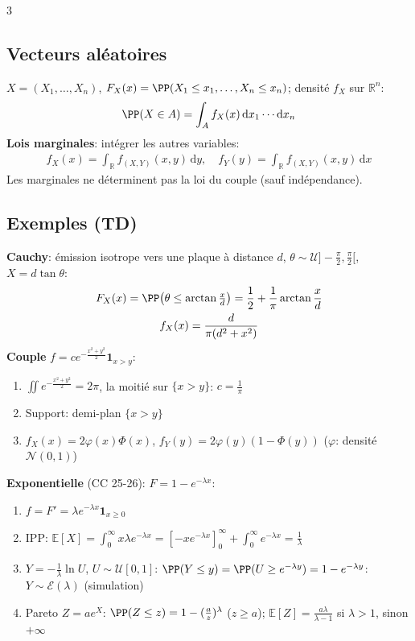 \documentclass[12pt, a4paper]{article}
\newcommand{\dd}{\mathrm{d}}
\newcommand{\E}{\mathbb{E}}
\newcommand{\R}{\mathbb{R}}
\newcommand{\ind}{\mathbf{1}}
\begin{document}
\begin{multicols*}{3}
	\colbreak
	\subsection{Vecteurs aléatoires}
	$X=(X_1,\dots,X_n)$, $F_X(x)=\PP(X_1\leq x_1,\dots,X_n\leq x_n)$; densité $f_X$ sur $\R^n$:
	\begin{gather*}
		\PP(X\in A)=\int_Af_X(x)\,\dd x_1\cdots\dd x_n
	\end{gather*}
	\textbf{Lois marginales}: intégrer les autres variables:
	\begin{gather*}
		f_X(x)=\int_\R f_{(X,Y)}(x,y)\,\dd y,\quad f_Y(y)=\int_\R f_{(X,Y)}(x,y)\,\dd x
	\end{gather*}
	Les marginales ne déterminent pas la loi du couple (sauf indépendance).

	\subsection{Exemples (TD)}
	\textbf{Cauchy}: émission isotrope vers une plaque à distance $d$, $\theta\sim\mathcal U]-\frac\pi2,\frac\pi2[$, $X=d\tan\theta$:
	\begin{gather*}
		F_X(x)=\PP\big(\theta\leq\arctan\tfrac xd\big)=\frac12+\frac1\pi\arctan\frac xd\\
		f_X(x)=\frac{d}{\pi(d^2+x^2)}
	\end{gather*}
	\textbf{Couple} $f=ce^{-\frac{x^2+y^2}2}\ind_{x>y}$:
	\begin{enumerate}[\roman*.]
		\item $\iint e^{-\frac{x^2+y^2}2}=2\pi$, la moitié sur $\{x>y\}$: $c=\frac1\pi$
		\item Support: demi-plan $\{x>y\}$
		\item $f_X(x)=2\varphi(x)\Phi(x)$, $f_Y(y)=2\varphi(y)(1-\Phi(y))$ ($\varphi$: densité $\mathcal N(0,1)$)
	\end{enumerate}
	\textbf{Exponentielle} (CC 25-26): $F=1-e^{-\lambda x}$:
	\begin{enumerate}[\roman*.]
		\item $f=F'=\lambda e^{-\lambda x}\ind_{x\geq0}$
		\item IPP: $\E[X]=\int_0^\infty x\lambda e^{-\lambda x}=[-xe^{-\lambda x}]_0^\infty+\int_0^\infty e^{-\lambda x}=\frac1\lambda$
		\item $Y=-\frac1\lambda\ln U$, $U\sim\mathcal U[0,1]$: $\PP(Y\leq y)=\PP(U\geq e^{-\lambda y})=1-e^{-\lambda y}$: $Y\sim\mathcal E(\lambda)$ (simulation)
		\item Pareto $Z=ae^X$: $\PP(Z\leq z)=1-(\frac az)^\lambda$ ($z\geq a$); $\E[Z]=\frac{a\lambda}{\lambda-1}$ si $\lambda>1$, sinon $+\infty$
	\end{enumerate}


\end{multicols*}
\end{document}
